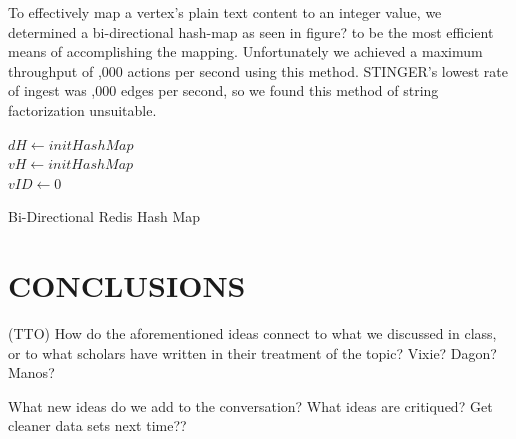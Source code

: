 \documentclass{acm_proc_article-sp}
\begin{document}
To effectively map a vertex's plain text content to an integer value, we determined a bi-directional hash-map as seen in figure? to be the most efficient means of accomplishing the mapping.
Unfortunately we achieved a maximum throughput of ,000 actions per second using this method. STINGER's lowest rate of ingest was ,000 edges per second, so we found this method of string factorization unsuitable.

\begin{algorithm}
\SetAlgoLined
{}
 $dH \leftarrow initHashMap$\\
 $vH \leftarrow initHashMap$\\
 $vID \leftarrow 0$\\
\caption{Bi-Directional Redis Hash Map}
\end{algorithm}



\section{CONCLUSIONS}

(TTO)
How do the aforementioned ideas connect to what we discussed in class, or to what scholars have written in their treatment of the topic? Vixie? Dagon? Manos?

What new ideas do we add to the conversation? 
What ideas are critiqued?  Get cleaner data sets next time??
\end{document}
